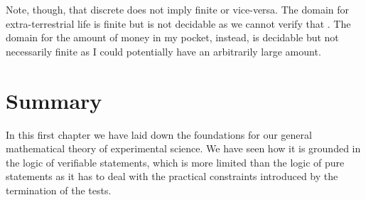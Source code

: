 	Note, though, that discrete does not imply finite or vice-versa. The domain for extra-terrestrial life is finite but is not decidable as we cannot verify that . The domain for the amount of money in my pocket, instead, is decidable but not necessarily finite as I could potentially have an arbitrarily large amount.
	
	\section{Summary}
	
	In this first chapter we have laid down the foundations for our general mathematical theory of experimental science. We have seen how it is grounded in the logic of verifiable statements, which is more limited than the logic of pure statements as it has to deal with the practical constraints introduced by the termination of the tests.
	
